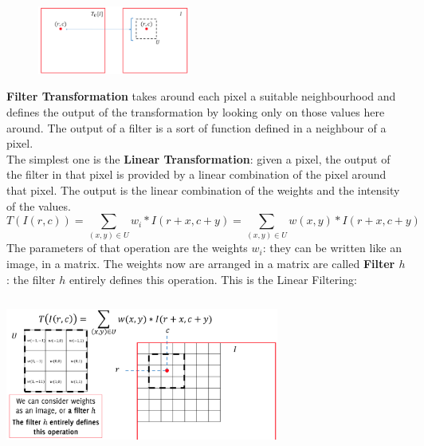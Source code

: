 \begin{figure}
    \includegraphics[width=5cm]{images/local_transformation.png}
\end{figure} 

\textbf{Filter Transformation} takes around each pixel a suitable neighbourhood and defines the output of the transformation by looking only on those values here around.  The output of a filter is a sort of function defined in a neighbour of a pixel. \\
The simplest one is the \textbf{Linear Transformation}: given a pixel, the output of the filter in that pixel is provided by a linear combination of the pixel around that pixel. The output is the linear combination of the weights and the intensity of the values. 
$$ T(I(r,c)) = \sum_{(x, y) \in U} w_i * I(r+x, c+y) = \sum_{(x, y) \in U} w(x, y) * I(r+x, c+y) $$
The parameters of that operation are the weights $w_i$: they can be written like an image, in a matrix. The weights now are arranged in a matrix are called \textbf{Filter $h$}: the filter $h$  entirely defines this operation. This is the Linear Filtering: \\
\begin{minipage}{\linewidth}
        \centering
        \includegraphics[width=9cm, height=5cm]{images/linear_filter.png}
        \label{fig:log_arch}
\end{minipage} \\

